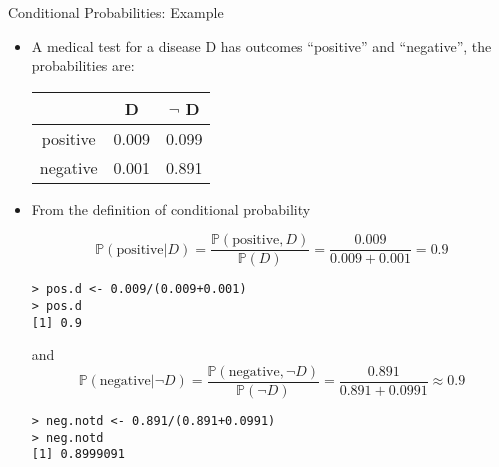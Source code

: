 \documentclass[handout]{beamer}
\begin{document}
\begin{frame}[fragile]{Conditional Probabilities: Example}
\scriptsize{
\begin{itemize}
\item A medical test for a disease D has outcomes ``positive'' and ``negative'',  the probabilities are:

\begin{center}
\begin{tabular}{c|cc}
& D & $\neg$ D \\  \hline
positive & 0.009 & 0.099 \\
negative & 0.001 & 0.891 \\ 
\end{tabular}
\end{center}

\item From the definition of conditional probability

\begin{displaymath}
\mathbb{P}(\text{positive}|D) = \frac{\mathbb{P}(\text{positive},D)}{\mathbb{P}(D)}  = \frac{0.009}{0.009+0.001} = 0.9  
\end{displaymath}

\begin{verbatim}
> pos.d <- 0.009/(0.009+0.001)
> pos.d
[1] 0.9 
\end{verbatim}



and 
\begin{displaymath}
\mathbb{P}(\text{negative}|\neg D) = \frac{\mathbb{P}(\text{negative},\neg D)}{\mathbb{P}(\neg D)}  = \frac{0.891}{0.891+0.0991} \approx 0.9  
\end{displaymath}

\begin{verbatim}
> neg.notd <- 0.891/(0.891+0.0991)
> neg.notd
[1] 0.8999091 
\end{verbatim}



\end{itemize}




} 
\end{frame}
\end{document}
